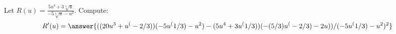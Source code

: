 \documentclass{ximera}
\begin{document}
\begin{exercise}
Let $R(u) = \frac{ 5 u^4+3 \sqrt[3]{u}}{-5 \sqrt[3]{u}-u^2}$. Compute:
\[
R'(u)
=\answer{ ( (20u^3+u^(-2/3))(-5u^(1/3)-u^2)-(5u^4+3u^(1/3))(-(5/3)u^(-2/3)-2u))/(-5u^(1/3)-u^2)^2 }
\]
\end{exercise}
\end{document}
